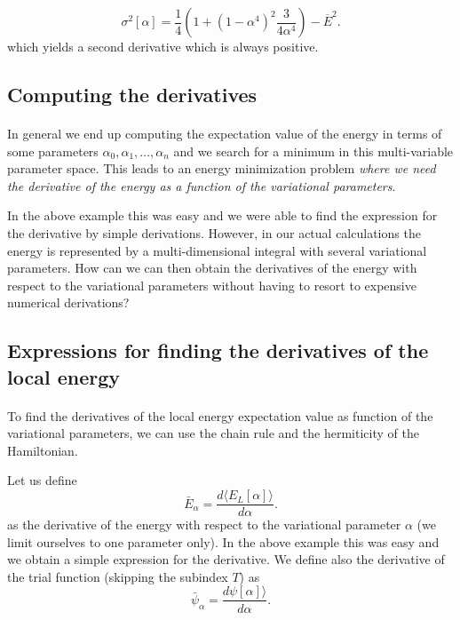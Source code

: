 \documentclass[%
oneside,                 %
final,                   %
10pt]{article}
\begin{document}
\[
\sigma^2[\alpha]=\frac{1}{4}\left(1+(1-\alpha^4)^2\frac{3}{4\alpha^4}\right)-\overline{E}^2.
\]
which yields a second derivative which is always positive.



\subsection*{Computing the derivatives}

\paragraph{}

In general we end up computing the expectation value of the energy in terms 
of some parameters $\alpha_0,\alpha_1,\dots,\alpha_n$
and we search for a minimum in this multi-variable parameter space.  
This leads to an energy minimization problem \emph{where we need the derivative of the energy as a function of the variational parameters}.

In the above example this was easy and we were able to find the expression for the derivative by simple derivations. 
However, in our actual calculations the energy is represented by a multi-dimensional integral with several variational parameters.
How can we can then obtain the derivatives of the energy with respect to the variational parameters without having 
to resort to expensive numerical derivations?



\subsection*{Expressions for finding the derivatives of the local energy}

\paragraph{}

To find the derivatives of the local energy expectation value as function of the variational parameters, we can use the chain rule and the hermiticity of the Hamiltonian.  

Let us define 
\[
\bar{E}_{\alpha}=\frac{d\langle  E_L[\alpha]\rangle}{d\alpha}.
\]
as the derivative of the energy with respect to the variational parameter $\alpha$ (we limit ourselves to one parameter only).
In the above example this was easy and we obtain a simple expression for the derivative.
We define also the derivative of the trial function (skipping the subindex $T$) as 
\[
\bar{\psi}_{\alpha}=\frac{d\psi[\alpha]\rangle}{d\alpha}.
\]
\end{document}
